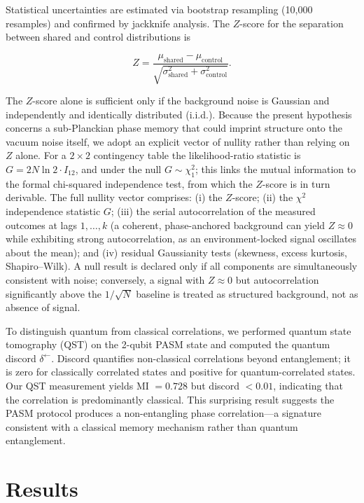 ﻿\documentclass[12pt,a4paper]{article}
\begin{document}
Statistical uncertainties are estimated via bootstrap resampling (10,000 resamples) and confirmed by jackknife analysis. The $Z$-score for the separation between shared and control distributions is

\begin{equation}
Z = \frac{\mu_{\text{shared}} - \mu_{\text{control}}}{\sqrt{\sigma^2_{\text{shared}} + \sigma^2_{\text{control}}}}.
\end{equation}

The $Z$-score alone is sufficient only if the background noise is Gaussian and independently and identically distributed (i.i.d.). Because the present hypothesis concerns a sub-Planckian phase memory that could imprint structure onto the vacuum noise itself, we adopt an explicit vector of nullity rather than relying on $Z$ alone. For a $2\times2$ contingency table the likelihood-ratio statistic is $G = 2N\ln 2 \cdot I_{12}$, and under the null $G \sim \chi^2_1$; this links the mutual information to the formal chi-squared independence test, from which the $Z$-score is in turn derivable. The full nullity vector comprises: (i) the $Z$-score; (ii) the $\chi^2$ independence statistic $G$; (iii) the serial autocorrelation of the measured outcomes at lags $1,\ldots,k$ (a coherent, phase-anchored background can yield $Z \approx 0$ while exhibiting strong autocorrelation, as an environment-locked signal oscillates about the mean); and (iv) residual Gaussianity tests (skewness, excess kurtosis, Shapiro--Wilk). A null result is declared only if all components are simultaneously consistent with noise; conversely, a signal with $Z \approx 0$ but autocorrelation significantly above the $1/\sqrt{N}$ baseline is treated as structured background, not as absence of signal.

To distinguish quantum from classical correlations, we performed quantum state tomography (QST) on the 2-qubit PASM state and computed the quantum discord $\delta^\leftarrow$. Discord quantifies non-classical correlations beyond entanglement; it is zero for classically correlated states and positive for quantum-correlated states. Our QST measurement yields MI $= 0.728$ but discord $< 0.01$, indicating that the correlation is predominantly classical. This surprising result suggests the PASM protocol produces a non-entangling phase correlation---a signature consistent with a classical memory mechanism rather than quantum entanglement.

\section{Results}
\label{sec:results}
\end{document}
